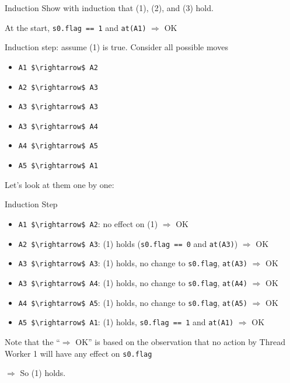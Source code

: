 \begin{frame}[fragile]{Induction}
  Show with induction that (1), (2), and (3) hold.


  At the start, \lstinline!s0.flag == 1! and \lstinline!at(A1)!
  $\Rightarrow$ {\color{green} OK}


  Induction step: assume (1) is true. Consider all possible moves

  \begin{itemize}
  \item \lstinline!A1 $\rightarrow$ A2!
  \item \lstinline!A2 $\rightarrow$ A3!
  \item \lstinline!A3 $\rightarrow$ A3!
  \item \lstinline!A3 $\rightarrow$ A4!
  \item \lstinline!A4 $\rightarrow$ A5!  
  \item \lstinline!A5 $\rightarrow$ A1!
  \end{itemize}


  Let's look at them one by one:
\end{frame}

\begin{frame}[fragile]{Induction Step}
  \begin{itemize}
  \item \lstinline!A1 $\rightarrow$ A2!: no effect on (1)
    $\Rightarrow$ {\color{green} OK}
  \item \lstinline!A2 $\rightarrow$ A3!: (1) holds
    (\lstinline!s0.flag == 0! and \lstinline!at(A3)!) $\Rightarrow$
    {\color{green} OK}
  \item \lstinline!A3 $\rightarrow$ A3!: (1) holds, no change to
    \lstinline!s0.flag!, \lstinline!at(A3)! $\Rightarrow$
    {\color{green} OK}
  \item \lstinline!A3 $\rightarrow$ A4!: (1) holds, no change to
    \lstinline!s0.flag!, \lstinline!at(A4)! $\Rightarrow$
    {\color{green} OK}
  \item \lstinline!A4 $\rightarrow$ A5!: (1) holds, no change to
    \lstinline!s0.flag!, \lstinline!at(A5)! $\Rightarrow$
    {\color{green} OK}
  \item \lstinline!A5 $\rightarrow$ A1!: (1) holds,
    \lstinline!s0.flag == 1! and \lstinline!at(A1)! $\Rightarrow$
    {\color{green} OK}
  \end{itemize}


  Note that the ``$\Rightarrow$ {\color{green} OK}'' is based on the
  observation that no action by Thread Worker 1 will have any effect
  on \lstinline!s0.flag!


  $\Rightarrow$ So (1) holds.
\end{frame}



